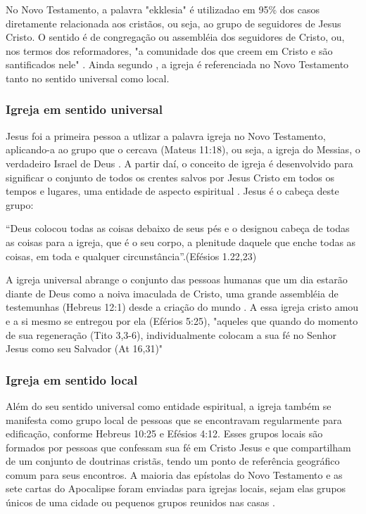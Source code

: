 \documentclass[
	12pt,				%
	openright,			%
	twoside,			%
	a4paper,			%
	english,			%
	french,				%
	spanish,			%
	brazil				%
	]{abntex2}
\begin{document}
No Novo Testamento, a palavra "ekklesia" é utilizadao em 95\% dos casos diretamente relacionada aos cristãos, ou seja, ao grupo de seguidores de Jesus Cristo. O sentido é de congregação ou assembléia dos seguidores de Cristo, ou, nos termos dos reformadores, "a comunidade dos que creem em Cristo e são santificados nele" \cite[318]{zac}. Ainda segundo \cite[318]{zac}, a igreja é referenciada no Novo Testamento tanto no sentido universal como local. 

\subsubsection{Igreja em sentido universal}

Jesus foi a primeira pessoa a utlizar a palavra igreja no Novo Testamento, aplicando-a ao grupo que o cercava (Mateus 11:18), ou seja, a igreja do Messias, o verdadeiro Israel de Deus \cite[911]{berkhof}. A partir daí, o conceito de igreja é desenvolvido para significar o conjunto de todos os crentes salvos por Jesus Cristo em todos os tempos e lugares, uma entidade de aspecto espiritual \cite[318]{zac}. Jesus é o cabeça deste grupo:
\begin{citacao}“Deus colocou todas as coisas debaixo de seus pés e o designou cabeça de todas as coisas para a igreja, que é o seu corpo, a plenitude daquele que enche todas as coisas, em toda e qualquer circunstância”.(Efésios 1.22,23)
\end{citacao}

A igreja universal abrange o conjunto das pessoas humanas que um dia estarão diante de Deus como a noiva imaculada de Cristo, uma grande assembléia de testemunhas (Hebreus 12:1) desde a criação do mundo \cite[607]{bavinck}. A essa igreja cristo amou e a si mesmo se entregou por ela (Eférios 5:25), "aqueles que quando do momento de sua regeneração (Tito 3,3-6), individualmente colocam a sua fé no Senhor Jesus como seu Salvador (At 16,31)" \cite[319]{zac}


\subsubsection{Igreja em sentido local}

Além do seu sentido universal como entidade espiritual, a igreja também se manifesta como grupo local de pessoas que se encontravam regularmente para edificação, conforme Hebreus 10:25 e Efésios 4:12. Esses grupos locais são formados por pessoas que confessam sua fé em Cristo Jesus e que compartilham de um conjunto de doutrinas cristãs, tendo um ponto de referência geográfico comum para seus encontros. A maioria das epístolas do Novo Testamento e as sete cartas do Apocalipse foram enviadas para igrejas locais, sejam elas grupos únicos de uma cidade ou pequenos grupos reunidos nas casas \cite[320]{zac}.
\end{document}
